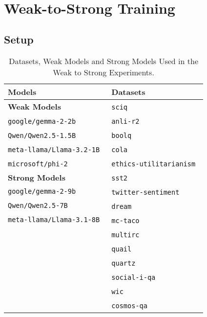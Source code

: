 \section{Weak-to-Strong Training}

\subsection{Setup}
\label{sec:w2ssetup}
\begin{table}[h]
    \centering
    \caption{Datasets, Weak Models and Strong Models Used in the Weak to Strong Experiments.}
    \begin{tabular}{l|l}
        \hline
        \textbf{Models} & \textbf{Datasets} \\
        \hline
        \textbf{Weak Models} &  \texttt{sciq}~\citep{welbl2017crowdsourcing} \\
        \texttt{google/gemma-2-2b}~\citep{gemmateam2024gemma2improvingopen} & \texttt{anli-r2}~\citep{nie2019adversarial}\\
        \texttt{Qwen/Qwen2.5-1.5B}~\citep{qwen2025qwen25technicalreport} & \texttt{boolq}~\citep{clark2019boolq} \\
        \texttt{meta-llama/Llama-3.2-1B}~\citep{grattafiori2024llama3herdmodels} & \texttt{cola}~\citep{warstadt2019neural} \\
        \texttt{microsoft/phi-2}~\citep{li2023textbooksneediiphi15} &  \texttt{ethics-utilitarianism}~\citep{hendrycks2020aligning} \\
         \textbf{Strong Models} & \texttt{sst2}~\citep{socher2013recursive} \\
        \texttt{google/gemma-2-9b} &  \texttt{twitter-sentiment}~\citep{paws2019naacl} \\
         \texttt{Qwen/Qwen2.5-7B}  & \texttt{dream}~\citep{sun2019dream} \\
         \texttt{meta-llama/Llama-3.1-8B}  & \texttt{mc-taco}~\citep{Zhou19taco} \\
         &  \texttt{multirc}~\citep{khashabi2018looking} \\
         & \texttt{quail}~\citep{rogers2020getting} \\
         &  \texttt{quartz}~\citep{tajford19quartz} \\
         &  \texttt{social-i-qa}~\citep{sap2019socialiqa} \\
         &  \texttt{wic}~\citep{pilehvar2018wic} \\
         &  \texttt{cosmos-qa}~\citep{huang2019cosmos} \\
        \hline
    \end{tabular}
    \label{tab:weak_strong_datasets}
\end{table}

